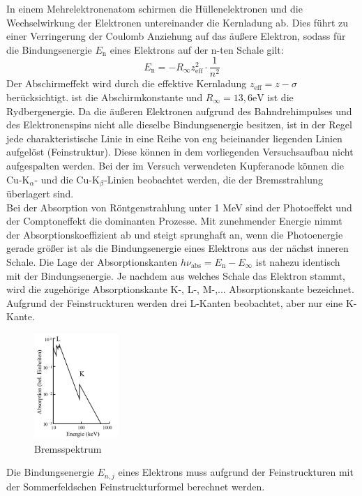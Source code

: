 In einem Mehrelektronenatom schirmen die Hüllenelektronen und die Wechselwirkung der Elektronen untereinander die Kernladung ab.
Dies führt zu einer Verringerung der Coulomb Anziehung auf das äußere Elektron, sodass für die Bindungsenergie $E_\text{n}$ eines Elektrons auf der n-ten Schale gilt:
\begin{equation}
    E_\text{n} = -R_{\infty}z_{\text{eff}}^2 \cdot \frac{1}{n^2}
    \label{eqn:gl2}
\end{equation}
Der Abschirmeffekt wird durch die effektive Kernladung $z_{\text{eff}} = z - \sigma$ berücksichtigt. 
\sigma ist die Abschirmkonstante und $R_{\infty} = 13,6 \text{eV}$ ist die Rydbergenergie.
Da die äußeren Elektronen aufgrund des Bahndrehimpulses und des Elektronenspins nicht alle dieselbe Bindungsenergie besitzen, ist in der Regel jede charakteristische Linie in eine Reihe von eng beieinander liegenden Linien aufgelöst (Feinstruktur).
Diese können in dem vorliegenden Versuchsaufbau nicht aufgespalten werden.
Bei der im Versuch verwendeten Kupferanode können die $\text{Cu-K}_{\alpha}\text{- und die Cu-K}_{\beta}\text{-Linien}$ beobachtet werden, die der Bremsstrahlung überlagert sind.\\
\noindent
Bei der Absorption von Röntgenstrahlung unter 1 MeV sind der Photoeffekt und der Comptoneffekt die dominanten Prozesse.
Mit zunehmender Energie nimmt der Absorptionskoeffizient ab und steigt sprunghaft an, wenn die Photoenergie gerade größer ist als die Bindungsenergie eines Elektrons aus der nächst inneren Schale.
Die Lage der Absorptionskanten $h \nu_{\text{abs}} = E_{\text{n}} - E_{\infty}$ ist nahezu identisch mit der Bindungsenergie.
Je nachdem aus welches Schale das Elektron stammt, wird die zugehörige Absorptionskante K-, L-, M-,... Absorptionskante bezeichnet.
Aufgrund der Feinstruckturen werden drei L-Kanten beobachtet, aber nur eine K-Kante.
\begin{figure}
    \centering
    \includegraphics[height=4.0cm]{data/abb2.jpg}
    \caption{Bremsspektrum \cite{V602}}
    \label{fig:abb1}
\end{figure}
Die Bindungsenergie $E_{n,j}$ eines Elektrons muss aufgrund der Feinstruckturen mit der Sommerfeldschen Feinstruckturformel berechnet werden.
